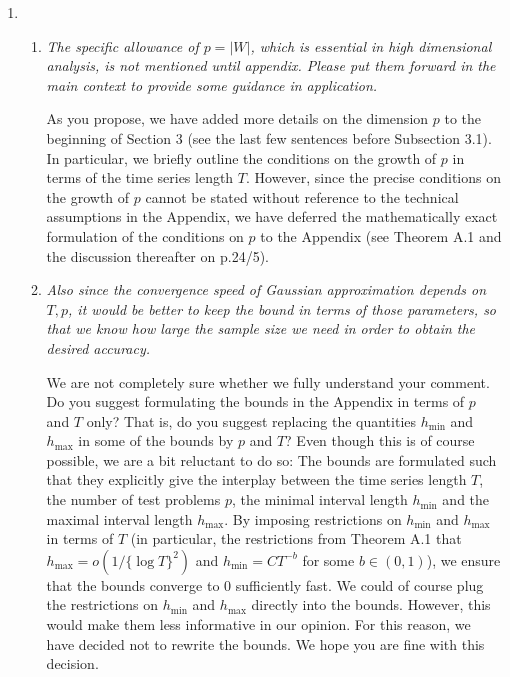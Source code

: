 \documentclass[a4paper,12pt]{article}
\begin{document}
\begin{enumerate}[label=(\arabic*),leftmargin=0.7cm]
\item \begin{enumerate}[label=(\alph*),leftmargin=0.7cm]
\item \textit{The specific allowance of $p = |W|$, which is essential in high dimensional analysis, is not mentioned until appendix. Please put them forward in the main context to provide some guidance in application.}

As you propose, we have added more details on the dimension $p$ to the beginning of Section 3 (see the last few sentences before Subsection 3.1). In particular, we briefly outline the conditions on the growth of $p$ in terms of the time series length $T$. 
However, since the precise conditions on the growth of $p$ cannot be stated without reference to the technical assumptions in the Appendix, we have deferred the mathematically exact formulation of the conditions on $p$ to the Appendix (see Theorem A.1 and the discussion thereafter on p.24/5). 


\item \textit{Also since the convergence speed of Gaussian approximation depends on $T, p$, it would be better to keep the bound in terms of those parameters, so that we know how large the sample size we need in order to obtain the desired accuracy.}

We are not completely sure whether we fully understand your comment. Do you suggest formulating the bounds in the Appendix in terms of $p$ and $T$ only? That is, do you suggest replacing the quantities $h_{\min}$ and $h_{\max}$ in some of the bounds by $p$ and $T$? Even though this is of course possible, we are a bit reluctant to do so: The bounds are formulated such that they explicitly give the interplay between the time series length $T$, the number of test problems $p$, the minimal interval length $h_{\min}$ and the maximal interval length $h_{\max}$. By imposing restrictions on $h_{\min}$ and $h_{\max}$ in terms of $T$ (in particular, the restrictions from Theorem A.1 that $h_{\max} = o(1/\{\log T\}^2)$ and $h_{\min} = C T^{-b}$ for some $b \in (0,1)$), we ensure that the bounds converge to $0$ sufficiently fast. We could of course plug the restrictions on $h_{\min}$ and $h_{\max}$ directly into the bounds. However, this would make them less informative in our opinion. For this reason, we have decided not to rewrite the bounds. We hope you are fine with this decision. 
\end{enumerate}


\end{enumerate}
\end{document}
